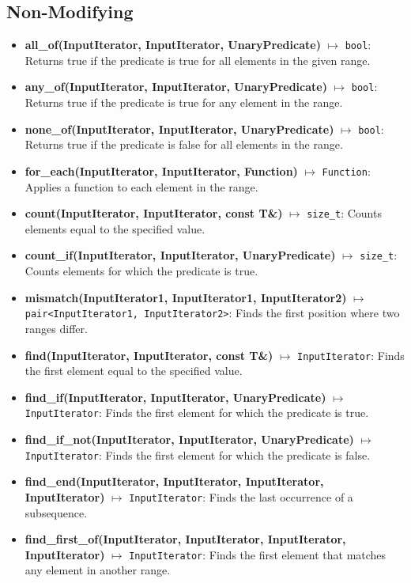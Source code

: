 \documentclass{report}
\begin{document}
    \subsection{Non-Modifying}
    \begin{itemize}
        \item \textbf{all\_of(InputIterator, InputIterator, UnaryPredicate)} \(\mapsto\) \texttt{bool}: Returns true if the predicate is true for all elements in the given range.
        \item \textbf{any\_of(InputIterator, InputIterator, UnaryPredicate)} \(\mapsto\) \texttt{bool}: Returns true if the predicate is true for any element in the range.
        \item \textbf{none\_of(InputIterator, InputIterator, UnaryPredicate)} \(\mapsto\) \texttt{bool}: Returns true if the predicate is false for all elements in the range.
        \item \textbf{for\_each(InputIterator, InputIterator, Function)} \(\mapsto\) \texttt{Function}: Applies a function to each element in the range.
        \item \textbf{count(InputIterator, InputIterator, const T\&)} \(\mapsto\) \texttt{size\_t}: Counts elements equal to the specified value.
        \item \textbf{count\_if(InputIterator, InputIterator, UnaryPredicate)} \(\mapsto\) \texttt{size\_t}: Counts elements for which the predicate is true.
        \item \textbf{mismatch(InputIterator1, InputIterator1, InputIterator2)} \(\mapsto\) \texttt{pair<InputIterator1, InputIterator2>}: Finds the first position where two ranges differ.
        \item \textbf{find(InputIterator, InputIterator, const T\&)} \(\mapsto\) \texttt{InputIterator}: Finds the first element equal to the specified value.
        \item \textbf{find\_if(InputIterator, InputIterator, UnaryPredicate)} \(\mapsto\) \texttt{InputIterator}: Finds the first element for which the predicate is true.
        \item \textbf{find\_if\_not(InputIterator, InputIterator, UnaryPredicate)} \(\mapsto\) \texttt{InputIterator}: Finds the first element for which the predicate is false.
        \item \textbf{find\_end(InputIterator, InputIterator, InputIterator, InputIterator)} \(\mapsto\) \texttt{InputIterator}: Finds the last occurrence of a subsequence.
        \item \textbf{find\_first\_of(InputIterator, InputIterator, InputIterator, InputIterator)} \(\mapsto\) \texttt{InputIterator}: Finds the first element that matches any element in another range.

\end{itemize}
\end{document}

